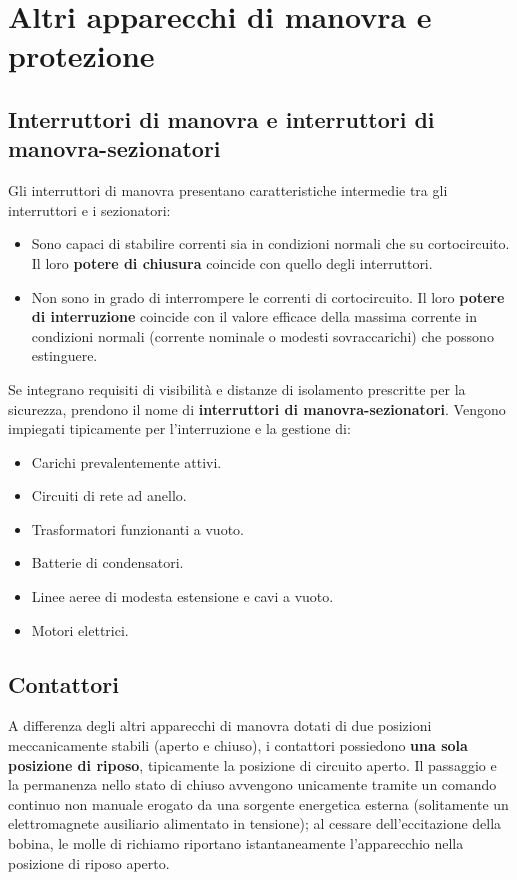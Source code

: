 \section{Altri apparecchi di manovra e protezione}
\subsection{Interruttori di manovra e interruttori di manovra-sezionatori}
Gli interruttori di manovra presentano caratteristiche intermedie tra gli interruttori e i sezionatori:
\begin{itemize}
    \item Sono capaci di stabilire correnti sia in condizioni normali che su cortocircuito. Il loro \textbf{potere di chiusura} coincide con quello degli interruttori.
    \item Non sono in grado di interrompere le correnti di cortocircuito. Il loro \textbf{potere di interruzione} coincide con il valore efficace della massima corrente in condizioni normali (corrente nominale o modesti sovraccarichi) che possono estinguere.
\end{itemize}

Se integrano requisiti di visibilità e distanze di isolamento prescritte per la sicurezza, prendono il nome di \textbf{interruttori di manovra-sezionatori}. Vengono impiegati tipicamente per l'interruzione e la gestione di:
\begin{itemize}
    \item Carichi prevalentemente attivi.
    \item Circuiti di rete ad anello.
    \item Trasformatori funzionanti a vuoto.
    \item Batterie di condensatori.
    \item Linee aeree di modesta estensione e cavi a vuoto.
    \item Motori elettrici.
\end{itemize}

\subsection{Contattori}
A differenza degli altri apparecchi di manovra dotati di due posizioni meccanicamente stabili (aperto e chiuso), i contattori possiedono \textbf{una sola posizione di riposo}, tipicamente la posizione di circuito aperto. Il passaggio e la permanenza nello stato di chiuso avvengono unicamente tramite un comando continuo non manuale erogato da una sorgente energetica esterna (solitamente un elettromagnete ausiliario alimentato in tensione); al cessare dell'eccitazione della bobina, le molle di richiamo riportano istantaneamente l'apparecchio nella posizione di riposo aperto.

